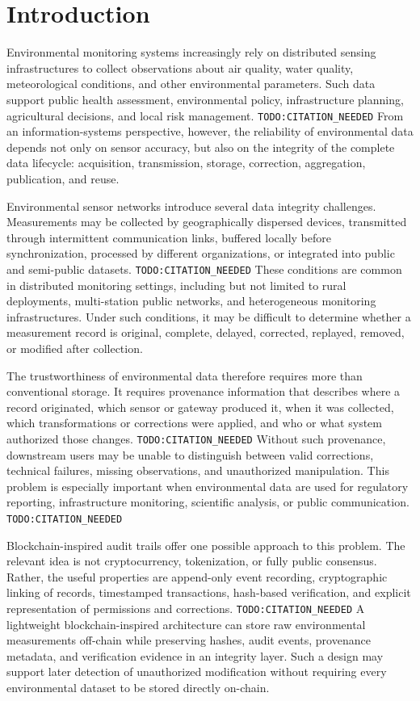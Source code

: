 \section{Introduction}

Environmental monitoring systems increasingly rely on distributed sensing infrastructures to collect observations about air quality, water quality, meteorological conditions, and other environmental parameters. Such data support public health assessment, environmental policy, infrastructure planning, agricultural decisions, and local risk management. \texttt{TODO:CITATION\_NEEDED} From an information-systems perspective, however, the reliability of environmental data depends not only on sensor accuracy, but also on the integrity of the complete data lifecycle: acquisition, transmission, storage, correction, aggregation, publication, and reuse.

Environmental sensor networks introduce several data integrity challenges. Measurements may be collected by geographically dispersed devices, transmitted through intermittent communication links, buffered locally before synchronization, processed by different organizations, or integrated into public and semi-public datasets. \texttt{TODO:CITATION\_NEEDED} These conditions are common in distributed monitoring settings, including but not limited to rural deployments, multi-station public networks, and heterogeneous monitoring infrastructures. Under such conditions, it may be difficult to determine whether a measurement record is original, complete, delayed, corrected, replayed, removed, or modified after collection.

The trustworthiness of environmental data therefore requires more than conventional storage. It requires provenance information that describes where a record originated, which sensor or gateway produced it, when it was collected, which transformations or corrections were applied, and who or what system authorized those changes. \texttt{TODO:CITATION\_NEEDED} Without such provenance, downstream users may be unable to distinguish between valid corrections, technical failures, missing observations, and unauthorized manipulation. This problem is especially important when environmental data are used for regulatory reporting, infrastructure monitoring, scientific analysis, or public communication. \texttt{TODO:CITATION\_NEEDED}

Blockchain-inspired audit trails offer one possible approach to this problem. The relevant idea is not cryptocurrency, tokenization, or fully public consensus. Rather, the useful properties are append-only event recording, cryptographic linking of records, timestamped transactions, hash-based verification, and explicit representation of permissions and corrections. \texttt{TODO:CITATION\_NEEDED} A lightweight blockchain-inspired architecture can store raw environmental measurements off-chain while preserving hashes, audit events, provenance metadata, and verification evidence in an integrity layer. Such a design may support later detection of unauthorized modification without requiring every environmental dataset to be stored directly on-chain.

